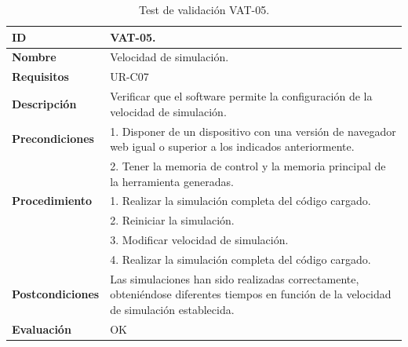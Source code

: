 \begin{center}
\begin{table}[htbp]
\centering
{}
\caption{Test de validación VAT-05.}
\begin{tabular}{@{}p{2.5cm} p{13cm}@{}} 
\toprule
\textbf{ID} 					& VAT-05. \\
\midrule
\textbf{Nombre} 				& Velocidad de simulación. \\
\midrule
\textbf{Requisitos} 		& UR-C07\\
\midrule
\textbf{Descripción} 		& Verificar que el \gls{software} permite la configuración de la velocidad de simulación. \\
\midrule
\textbf{Precondiciones}		& 1. Disponer de un dispositivo con una versión de navegador web igual o superior a los indicados anteriormente. \\
											& 2. Tener la memoria de control y la memoria principal de la herramienta generadas. \\
\midrule
\textbf{Procedimiento}		& 1. Realizar la simulación completa del código cargado.\\
											& 2. Reiniciar la simulación.\\
											& 3. Modificar velocidad de simulación. \\
											& 4. Realizar la simulación completa del código cargado.\\
\midrule
\textbf{Postcondiciones} 		&  Las simulaciones han sido realizadas correctamente, obteniéndose diferentes tiempos en función de la velocidad de simulación establecida.\\
\midrule
\textbf{Evaluación} 			& OK \\
\bottomrule
\end{tabular}
\label{tab:vat-05}
\end{table}
\end{center}

\vspace{-1.5cm}

